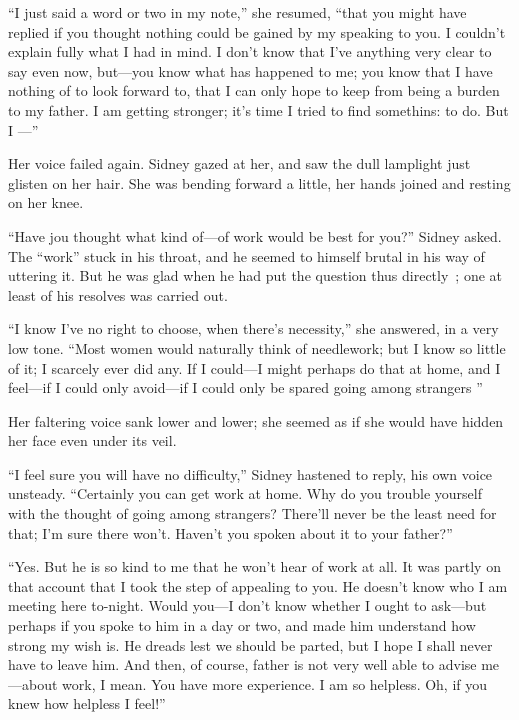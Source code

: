 ``I just said a word or two in my note,'' she resumed, ``that you might
have replied if you thought nothing could be gained by my speaking to
you. I couldn't explain fully what I had in mind. I don't know that I've
anything very clear to say even now, but---you know what has happened to
me; you know that I have nothing of to look forward to, that I can only
hope to keep from being a burden to my father. I am getting stronger;
it's time I tried to find somethins: to do. But I ---''

Her voice failed again. Sidney gazed at her, and saw the dull lamplight
just glisten on her hair. She was bending forward a little, her hands
joined and resting on her knee.

{\protect\hypertarget{81}{}{}} ``Have jou thought what kind of---of work
would be best for you?'' Sidney asked. The ``work'' stuck in his throat,
and he seemed to himself brutal in his way of uttering it. But he was
glad when he had put the question thus directly~; one at least of his
resolves was carried out.

``I know I've no right to choose, when there's necessity,'' she
answered, in a very low tone. ``Most women would naturally think of
needlework; but I know so little of it; I scarcely ever did any. If I
could---I might perhaps do that at home, and I feel---if I could only
avoid---if I could only be spared going among strangers ''

Her faltering voice sank lower and lower; she seemed as if she would
have hidden her face even under its veil.

``I feel sure you will have no difficulty,'' Sidney hastened to reply,
his own voice unsteady. ``Certainly you can get work at home. Why do you
trouble yourself with the thought of going among strangers? There'll
never be the least need for that; I'm sure there won't. Haven't you
spoken about it to your father?''

{\protect\hypertarget{82}{}{}} ``Yes. But he is so kind to me that he
won't hear of work at all. It was partly on that account that I took the
step of appealing to you. He doesn't know who I am meeting here
to-night. Would you---I don't know whether I ought to ask---but perhaps
if you spoke to him in a day or two, and made him understand how strong
my wish is. He dreads lest we should be parted, but I hope I shall never
have to leave him. And then, of course, father is not very well able to
advise me---about work, I mean. You have more experience. I am so
helpless. Oh, if you knew how helpless I feel!''

